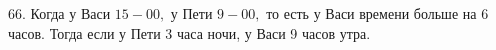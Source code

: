 66. Когда у Васи $15-00,$ у Пети $9-00,$ то есть у Васи времени больше на 6 часов. Тогда если у Пети 3 часа ночи, у Васи 9 часов утра.\\
